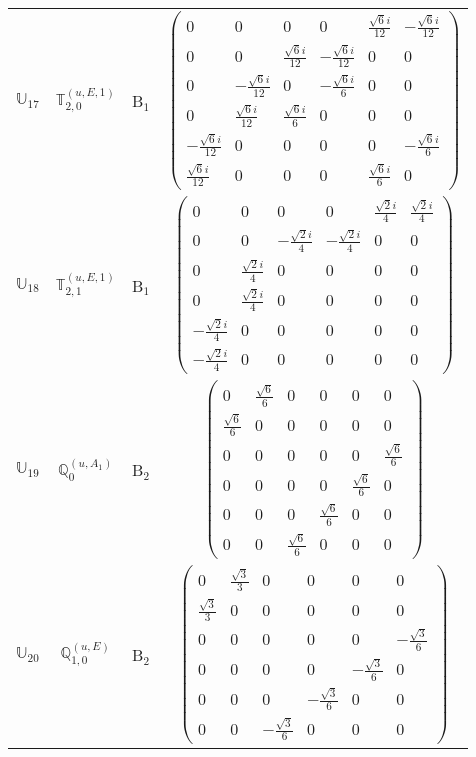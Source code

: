 \documentclass[fleqn,10pt,landscape]{article}
\begin{document}
\begin{itemize}
\begin{center}
\begin{longtable}{c|c|c|c}
$ \mathbb{U}_{17} $ & $\mathbb{T}_{2,0}^{(u,E,1)}$ & B$_{1}$ & $\begin{pmatrix} 0 & 0 & 0 & 0 & \frac{\sqrt{6} i}{12} & - \frac{\sqrt{6} i}{12} \\ 0 & 0 & \frac{\sqrt{6} i}{12} & - \frac{\sqrt{6} i}{12} & 0 & 0 \\ 0 & - \frac{\sqrt{6} i}{12} & 0 & - \frac{\sqrt{6} i}{6} & 0 & 0 \\ 0 & \frac{\sqrt{6} i}{12} & \frac{\sqrt{6} i}{6} & 0 & 0 & 0 \\ - \frac{\sqrt{6} i}{12} & 0 & 0 & 0 & 0 & - \frac{\sqrt{6} i}{6} \\ \frac{\sqrt{6} i}{12} & 0 & 0 & 0 & \frac{\sqrt{6} i}{6} & 0 \end{pmatrix}$ \\
$ \mathbb{U}_{18} $ & $\mathbb{T}_{2,1}^{(u,E,1)}$ & B$_{1}$ & $\begin{pmatrix} 0 & 0 & 0 & 0 & \frac{\sqrt{2} i}{4} & \frac{\sqrt{2} i}{4} \\ 0 & 0 & - \frac{\sqrt{2} i}{4} & - \frac{\sqrt{2} i}{4} & 0 & 0 \\ 0 & \frac{\sqrt{2} i}{4} & 0 & 0 & 0 & 0 \\ 0 & \frac{\sqrt{2} i}{4} & 0 & 0 & 0 & 0 \\ - \frac{\sqrt{2} i}{4} & 0 & 0 & 0 & 0 & 0 \\ - \frac{\sqrt{2} i}{4} & 0 & 0 & 0 & 0 & 0 \end{pmatrix}$ \\ \hline
$ \mathbb{U}_{19} $ & $\mathbb{Q}_{0}^{(u,A_{1})}$ & B$_{2}$ & $\begin{pmatrix} 0 & \frac{\sqrt{6}}{6} & 0 & 0 & 0 & 0 \\ \frac{\sqrt{6}}{6} & 0 & 0 & 0 & 0 & 0 \\ 0 & 0 & 0 & 0 & 0 & \frac{\sqrt{6}}{6} \\ 0 & 0 & 0 & 0 & \frac{\sqrt{6}}{6} & 0 \\ 0 & 0 & 0 & \frac{\sqrt{6}}{6} & 0 & 0 \\ 0 & 0 & \frac{\sqrt{6}}{6} & 0 & 0 & 0 \end{pmatrix}$ \\
$ \mathbb{U}_{20} $ & $\mathbb{Q}_{1,0}^{(u,E)}$ & B$_{2}$ & $\begin{pmatrix} 0 & \frac{\sqrt{3}}{3} & 0 & 0 & 0 & 0 \\ \frac{\sqrt{3}}{3} & 0 & 0 & 0 & 0 & 0 \\ 0 & 0 & 0 & 0 & 0 & - \frac{\sqrt{3}}{6} \\ 0 & 0 & 0 & 0 & - \frac{\sqrt{3}}{6} & 0 \\ 0 & 0 & 0 & - \frac{\sqrt{3}}{6} & 0 & 0 \\ 0 & 0 & - \frac{\sqrt{3}}{6} & 0 & 0 & 0 \end{pmatrix}$ \\

\end{longtable}
\end{center}
\end{itemize}
\end{document}
